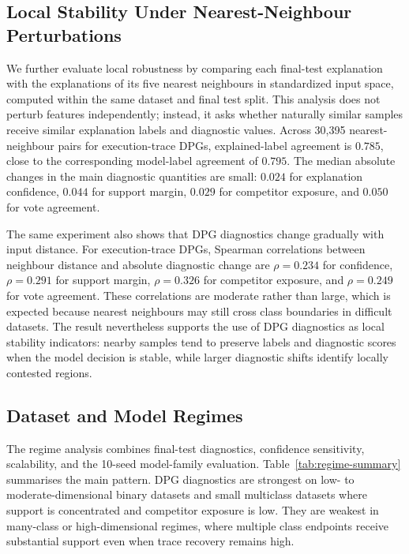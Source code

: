 \documentclass[runningheads]{llncs}
\begin{document}
\subsection{Local Stability Under Nearest-Neighbour Perturbations}

We further evaluate local robustness by comparing each final-test explanation with the explanations of its five nearest neighbours in standardized input space, computed within the same dataset and final test split. This analysis does not perturb features independently; instead, it asks whether naturally similar samples receive similar explanation labels and diagnostic values. Across 30,395 nearest-neighbour pairs for execution-trace DPGs, explained-label agreement is $0.785$, close to the corresponding model-label agreement of $0.795$. The median absolute changes in the main diagnostic quantities are small: $0.024$ for explanation confidence, $0.044$ for support margin, $0.029$ for competitor exposure, and $0.050$ for vote agreement.

The same experiment also shows that DPG diagnostics change gradually with input distance. For execution-trace DPGs, Spearman correlations between neighbour distance and absolute diagnostic change are $\rho=0.234$ for confidence, $\rho=0.291$ for support margin, $\rho=0.326$ for competitor exposure, and $\rho=0.249$ for vote agreement. These correlations are moderate rather than large, which is expected because nearest neighbours may still cross class boundaries in difficult datasets. The result nevertheless supports the use of DPG diagnostics as local stability indicators: nearby samples tend to preserve labels and diagnostic scores when the model decision is stable, while larger diagnostic shifts identify locally contested regions.

\subsection{Dataset and Model Regimes}

The regime analysis combines final-test diagnostics, confidence sensitivity, scalability, and the 10-seed model-family evaluation. Table~\ref{tab:regime-summary} summarises the main pattern. DPG diagnostics are strongest on low- to moderate-dimensional binary datasets and small multiclass datasets where support is concentrated and competitor exposure is low. They are weakest in many-class or high-dimensional regimes, where multiple class endpoints receive substantial support even when trace recovery remains high.
\end{document}
